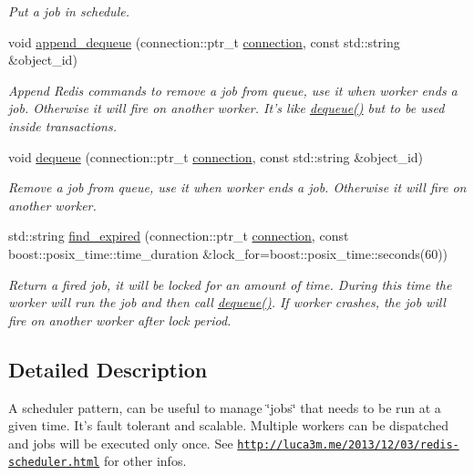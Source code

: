 \begin{DoxyCompactItemize}
\begin{DoxyCompactList}\small\item\em Put a job in schedule. \end{DoxyCompactList}\item 
void \hyperlink{classredis3m_1_1patterns_1_1scheduler_aabce4c75556019e2330b3235291b26a5}{append\-\_\-dequeue} (connection\-::ptr\-\_\-t \hyperlink{classredis3m_1_1connection}{connection}, const std\-::string \&object\-\_\-id)
\begin{DoxyCompactList}\small\item\em Append Redis commands to remove a job from queue, use it when worker ends a job. Otherwise it will fire on another worker. It's like \hyperlink{classredis3m_1_1patterns_1_1scheduler_a4e5f91b6f52da015407458c96dce07d9}{dequeue()} but to be used inside transactions. \end{DoxyCompactList}\item 
void \hyperlink{classredis3m_1_1patterns_1_1scheduler_a4e5f91b6f52da015407458c96dce07d9}{dequeue} (connection\-::ptr\-\_\-t \hyperlink{classredis3m_1_1connection}{connection}, const std\-::string \&object\-\_\-id)
\begin{DoxyCompactList}\small\item\em Remove a job from queue, use it when worker ends a job. Otherwise it will fire on another worker. \end{DoxyCompactList}\item 
std\-::string \hyperlink{classredis3m_1_1patterns_1_1scheduler_a170c9c40c4b9e8c5c722dc9be73b6366}{find\-\_\-expired} (connection\-::ptr\-\_\-t \hyperlink{classredis3m_1_1connection}{connection}, const boost\-::posix\-\_\-time\-::time\-\_\-duration \&lock\-\_\-for=boost\-::posix\-\_\-time\-::seconds(60))
\begin{DoxyCompactList}\small\item\em Return a fired job, it will be locked for an amount of time. During this time the worker will run the job and then call \hyperlink{classredis3m_1_1patterns_1_1scheduler_a4e5f91b6f52da015407458c96dce07d9}{dequeue()}. If worker crashes, the job will fire on another worker after lock period. \end{DoxyCompactList}\end{DoxyCompactItemize}


\subsection{Detailed Description}
A scheduler pattern, can be useful to manage \char`\"{}jobs\char`\"{} that needs to be run at a given time. It's fault tolerant and scalable. Multiple workers can be dispatched and jobs will be executed only once. See \href{http://luca3m.me/2013/12/03/redis-scheduler.html}{\tt http\-://luca3m.\-me/2013/12/03/redis-\/scheduler.\-html} for other infos. 

